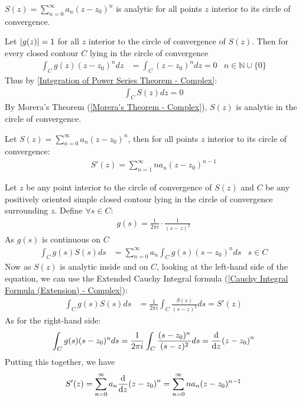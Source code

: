 \documentclass[12pt, english]{book}
\makeatletter
\renewenvironment{proof}[1][\proofname]{\par
	\pushQED{\qed}%
	\normalfont \topsep6\p@\@plus6\p@\relax
	\list{}{%
		\settowidth{\leftmargin}{\itshape\proofname:\hskip\labelsep}%
		\setlength{\labelwidth}{0pt}%
		\setlength{\itemindent}{-\leftmargin}%
		}%
	\item[\hskip\labelsep\itshape#1\@addpunct{:}]\ignorespaces
	}{\popQED\endlist\@endpefalse}
\makeatother
\begin{document}
	\begin{corollary}
		\(S(z) = \sum_{n=0}^{\infty} a_n (z-z_0)^n\) is analytic for all points \(z\) interior to its circle of convergence.
	\end{corollary}
	\begin{proof}
		Let \(\abs{g(z)} = 1\) for all \(z\) interior to the circle of convergence of \(S(z)\).
		Then for every closed contour \(C\) lying in the circle of convergence
		\begin{align*}
			\int_{C} g(z) (z-z_0)^n dz &= \int_{C} (z-z_0)^n dz = 0 
				& n \in \mathbb{N} \cup \{0\}
		\end{align*}
		Thus by \cref{Integration of Power Series Theorem - Complex}:
		\begin{align*}
			\int_{C} S(z) dz = 0
		\end{align*}
		By Morera's Theorem (\cref{Morera's Theorem - Complex}), \(S(z)\) is analytic in the circle of convergence.
	\end{proof}
	
	\begin{theorem}
		\label{Differentiation of Power Series Theorem - Complex}
		Let \(S(z) = \sum_{n=0}^{\infty} a_n (z-z_0)^n\), then for all points \(z\) interior to its circle of convergence:
		\begin{align*}
			S'(z) = \sum_{n=1}^{\infty} na_n (z-z_0)^{n-1}
		\end{align*}
	\end{theorem}
	\begin{proof}
		Let \(z\) be any point interior to the circle of convergence of \(S(z)\) and \(C\) be any positively oriented simple closed contour lying in the circle of convergence surrounding \(z\). Define \(\forall s \in C\):
		\begin{align*}
			g(s) = \frac{1}{2\pi i} \cdot \frac{1}{(s-z)^2}
		\end{align*}
		As \(g(s)\) is continuous on \(C\)
		\begin{align*}
			\int_{C} g(s) S(s) ds &= \sum_{n=0}^{\infty} a_n \int_{C} g(s) (s-z_0)^n ds
				& s \in C
		\end{align*}
		Now as \(S(z)\) is analytic inside and on \(C\), looking at the left-hand side of the equation, we can use the Extended Cauchy Integral formula (\cref{Cauchy Integral Formula (Extension) - Complex}):
		\begin{align*}
			\int_{C} g(s) S(s) ds 
			&= \frac{1}{2\pi i} \int_{C} \frac{S(s)}{(s-z)^2} ds = S'(z)
		\end{align*}
		As for the right-hand side:
		\begin{align*}
			\int_{C} g(s) (s-z_0)^n ds = \frac{1}{2\pi i} \int_{C} \frac{(s-z_0)^n}{(s-z)^2} ds = \dv{z} (z-z_0)^n
		\end{align*}
		Putting this together, we have
		\begin{align*}
			S'(z) 
			= \sum_{n=0}^{\infty} a_n \dv{z}(z-z_0)^n 
			= \sum_{n=0}^{\infty} n a_n (z-z_0)^{n-1}
		\end{align*}
	\end{proof}
\end{document}

